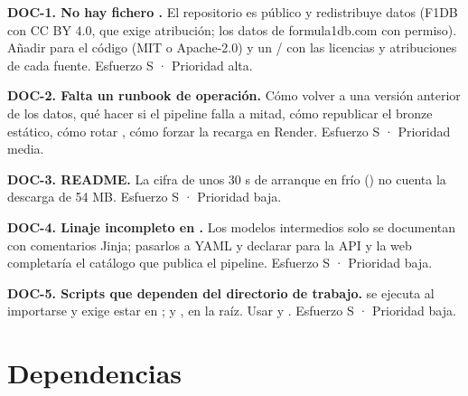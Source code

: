 \textbf{DOC-1. No hay fichero .} El repositorio es público y redistribuye datos (F1DB con CC BY 4.0, que exige atribución; los datos de formula1db.com con permiso). Añadir  para el código (MIT o Apache-2.0) y un / con las licencias y atribuciones de cada fuente. Esfuerzo S · Prioridad alta.

\textbf{DOC-2. Falta un runbook de operación.} Cómo volver a una versión anterior de los datos, qué hacer si el pipeline falla a mitad, cómo republicar el bronze estático, cómo rotar , cómo forzar la recarga en Render. Esfuerzo S · Prioridad media.

\textbf{DOC-3. README.} La cifra de unos 30 s de arranque en frío () no cuenta la descarga de 54 MB. Esfuerzo S · Prioridad baja.

\textbf{DOC-4. Linaje incompleto en .} Los modelos intermedios solo se documentan con comentarios Jinja; pasarlos a YAML y declarar  para la API y la web completaría el catálogo que publica el pipeline. Esfuerzo S · Prioridad baja.

\textbf{DOC-5. Scripts que dependen del directorio de trabajo.}  se ejecuta al importarse y exige estar en ;  y , en la raíz. Usar  y . Esfuerzo S · Prioridad baja.

\section{Dependencias}

